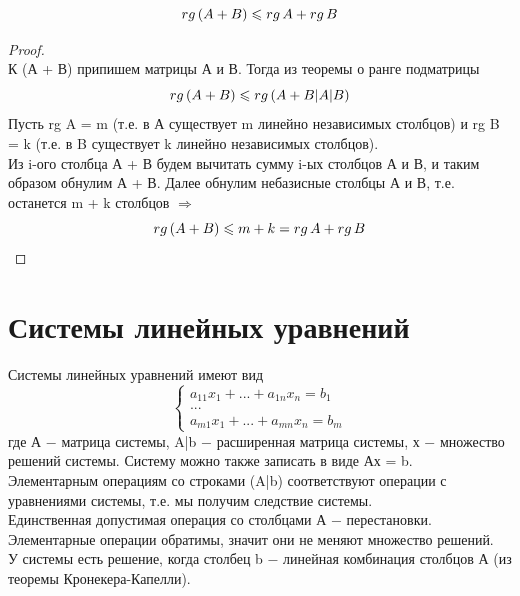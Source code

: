\begin{theorem}
    \[
    rg\thinspace (A + B) \leq rg\thinspace A + rg\thinspace B
    \]
\end{theorem}
\begin{proof}
    \tab\\

    К (А + В) припишем матрицы А и В. Тогда из теоремы о ранге подматрицы
    \[
    rg\thinspace(A + B) \leq rg\thinspace(A + B|A|B)
    \]
    Пусть rg A = m (т.е. в А существует m линейно независимых столбцов) и rg B = k (т.е. в B существует k линейно независимых столбцов).\\

    Из i-ого столбца А + В будем вычитать сумму i-ых столбцов А и В, и таким образом обнулим А + В. Далее обнулим небазисные столбцы А и В, т.е. останется m + k столбцов $\Longrightarrow$
    \[
    rg\thinspace(A + B) \leq m + k = rg\thinspace A + rg\thinspace B
    \]
\end{proof}

\section{Системы линейных уравнений}

Системы линейных уравнений имеют вид
\[
\begin{cases}
    a_{11}x_1 + ... + a_{1n}x_n = b_1\\
    ...\\
    a_{m1}x_1 + ... + a_{mn}x_n = b_m
\end{cases}
\]
где А $-$ матрица системы, A|b $-$ расширенная матрица системы, х $-$ множество решений системы. Систему можно также записать в виде Ах = b.\\

Элементарным операциям со строками (A|b) соответствуют операции с уравнениями системы, т.е. мы получим следствие системы.\\

Единственная допустимая операция со столбцами А $-$ перестановки.\\

Элементарные операции обратимы, значит они не меняют множество решений.\\

У системы есть решение, когда столбец b $-$ линейная комбинация столбцов А (из теоремы Кронекера-Капелли).\\

